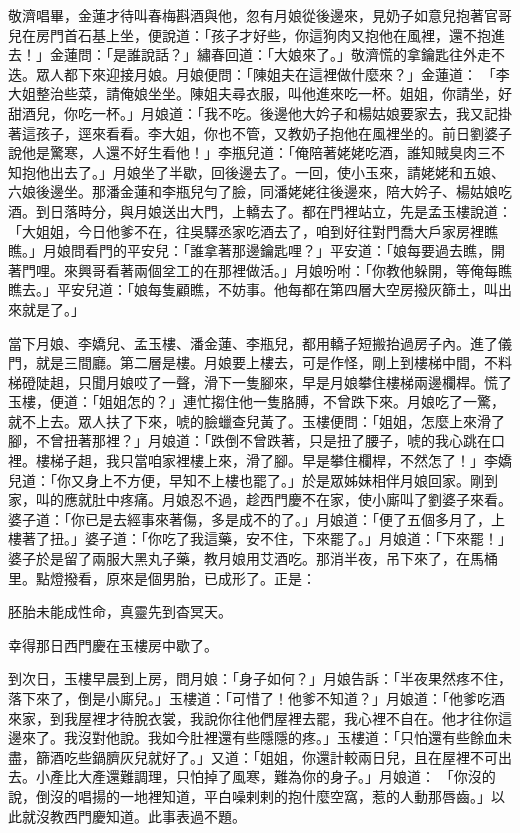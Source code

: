 敬濟唱畢，金蓮才待叫春梅斟酒與他，忽有月娘從後邊來，見奶子如意兒抱著官哥兒在房門首石基上坐，便說道：「孩子才好些，你這狗肉又抱他在風裡，還不抱進去！」金蓮問：「是誰說話？」繡春回道：「大娘來了。」敬濟慌的拿鑰匙往外走不迭。眾人都下來迎接月娘。月娘便問：「陳姐夫在這裡做什麼來？」金蓮道： 「李大姐整治些菜，請俺娘坐坐。陳姐夫尋衣服，叫他進來吃一杯。姐姐，你請坐，好甜酒兒，你吃一杯。」月娘道：「我不吃。後邊他大妗子和楊姑娘要家去，我又記掛著這孩子，逕來看看。李大姐，你也不管，又教奶子抱他在風裡坐的。前日劉婆子說他是驚寒，人還不好生看他！」李瓶兒道：「俺陪著姥姥吃酒，誰知賊臭肉三不知抱他出去了。」月娘坐了半歇，回後邊去了。一回，使小玉來，請姥姥和五娘、六娘後邊坐。那潘金蓮和李瓶兒勻了臉，同潘姥姥往後邊來，陪大妗子、楊姑娘吃酒。到日落時分，與月娘送出大門，上轎去了。都在門裡站立，先是孟玉樓說道：「大姐姐，今日他爹不在，往吳驛丞家吃酒去了，咱到好往對門喬大戶家房裡瞧瞧。」月娘問看門的平安兒：「誰拿著那邊鑰匙哩？」平安道：「娘每要過去瞧，開著門哩。來興哥看著兩個坌工的在那裡做活。」月娘吩咐：「你教他躲開，等俺每瞧瞧去。」平安兒道：「娘每隻顧瞧，不妨事。他每都在第四層大空房撥灰篩土，叫出來就是了。」

當下月娘、李嬌兒、孟玉樓、潘金蓮、李瓶兒，都用轎子短搬抬過房子內。進了儀門，就是三間廳。第二層是樓。月娘要上樓去，可是作怪，剛上到樓梯中間，不料梯磴陡趄，只聞月娘哎了一聲，滑下一隻腳來，早是月娘攀住樓梯兩邊欄桿。慌了玉樓，便道：「姐姐怎的？」連忙搊住他一隻胳膊，不曾跌下來。月娘吃了一驚，就不上去。眾人扶了下來，唬的臉蠟查兒黃了。玉樓便問：「姐姐，怎麼上來滑了腳，不曾扭著那裡？」月娘道：「跌倒不曾跌著，只是扭了腰子，唬的我心跳在口裡。樓梯子趄，我只當咱家裡樓上來，滑了腳。早是攀住欄桿，不然怎了！」李嬌兒道：「你又身上不方便，早知不上樓也罷了。」於是眾姊妹相伴月娘回家。剛到家，叫的應就肚中疼痛。月娘忍不過，趁西門慶不在家，使小廝叫了劉婆子來看。婆子道：「你已是去經事來著傷，多是成不的了。」月娘道：「便了五個多月了，上樓著了扭。」婆子道：「你吃了我這藥，安不住，下來罷了。」月娘道：「下來罷！」婆子於是留了兩服大黑丸子藥，教月娘用艾酒吃。那消半夜，吊下來了，在馬桶里。點燈撥看，原來是個男胎，已成形了。正是：

胚胎未能成性命，真靈先到杳冥天。

幸得那日西門慶在玉樓房中歇了。

到次日，玉樓早晨到上房，問月娘：「身子如何？」月娘告訴：「半夜果然疼不住，落下來了，倒是小廝兒。」玉樓道：「可惜了！他爹不知道？」月娘道：「他爹吃酒來家，到我屋裡才待脫衣裳，我說你往他們屋裡去罷，我心裡不自在。他才往你這邊來了。我沒對他說。我如今肚裡還有些隱隱的疼。」玉樓道：「只怕還有些餘血未盡，篩酒吃些鍋臍灰兒就好了。」又道：「姐姐，你還計較兩日兒，且在屋裡不可出去。小產比大產還難調理，只怕掉了風寒，難為你的身子。」月娘道： 「你沒的說，倒沒的唱揚的一地裡知道，平白噪剌剌的抱什麼空窩，惹的人動那唇齒。」以此就沒教西門慶知道。此事表過不題。

